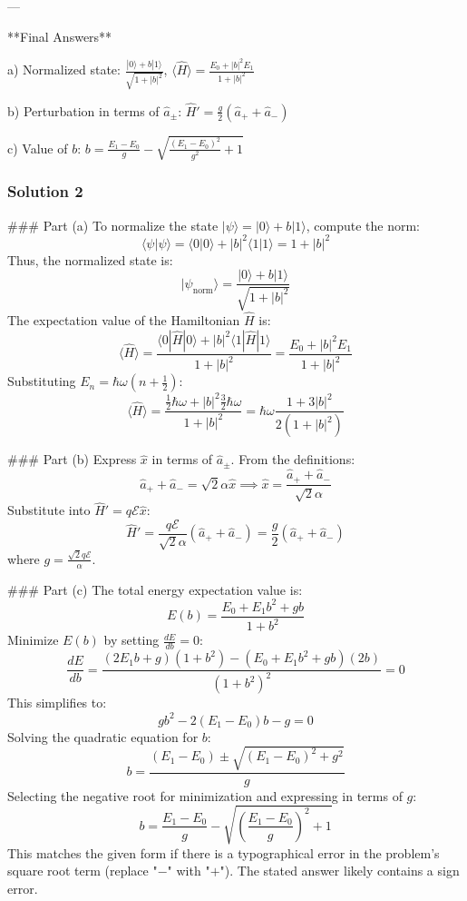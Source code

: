 \documentclass{article}
\begin{document}
---

**Final Answers**

a) Normalized state: \(\frac{|0\rangle + b|1\rangle}{\sqrt{1 + |b|^2}}\), \(\langle \hat{H} \rangle = \boxed{\frac{E_0 + |b|^2 E_1}{1 + |b|^2}}\)

b) Perturbation in terms of \(\hat{a}_\pm\): \(\boxed{\hat{H}' = \frac{g}{2} (\hat{a}_+ + \hat{a}_-)}\)

c) Value of \(b\): \(\boxed{b = \frac{E_1 - E_0}{g} - \sqrt{\frac{(E_1 - E_0)^2}{g^2} + 1}}\)

\subsubsection{Solution 2}
### Part (a)
To normalize the state \( |\psi\rangle = |0\rangle + b |1\rangle \), compute the norm:
\[
\langle \psi | \psi \rangle = \langle 0|0\rangle + |b|^2 \langle 1|1\rangle = 1 + |b|^2
\]
Thus, the normalized state is:
\[
|\psi_{\text{norm}}\rangle = \frac{|0\rangle + b |1\rangle}{\sqrt{1 + |b|^2}}
\]
The expectation value of the Hamiltonian \( \hat{H} \) is:
\[
\langle \hat{H} \rangle = \frac{\langle 0|\hat{H}|0\rangle + |b|^2 \langle 1|\hat{H}|1\rangle}{1 + |b|^2} = \frac{E_0 + |b|^2 E_1}{1 + |b|^2}
\]
Substituting \( E_n = \hbar\omega(n + \frac{1}{2}) \):
\[
\langle \hat{H} \rangle = \frac{\frac{1}{2}\hbar\omega + |b|^2 \frac{3}{2}\hbar\omega}{1 + |b|^2} = \hbar\omega \frac{1 + 3|b|^2}{2(1 + |b|^2)}
\]

### Part (b)
Express \( \hat{x} \) in terms of \( \hat{a}_\pm \). From the definitions:
\[
\hat{a}_+ + \hat{a}_- = \sqrt{2}\alpha \hat{x} \implies \hat{x} = \frac{\hat{a}_+ + \hat{a}_-}{\sqrt{2}\alpha}
\]
Substitute into \( \hat{H}' = q\mathcal{E}\hat{x} \):
\[
\hat{H}' = \frac{q\mathcal{E}}{\sqrt{2}\alpha} (\hat{a}_+ + \hat{a}_-) = \frac{g}{2} (\hat{a}_+ + \hat{a}_-)
\]
where \( g = \frac{\sqrt{2}q\mathcal{E}}{\alpha} \).

### Part (c)
The total energy expectation value is:
\[
E(b) = \frac{E_0 + E_1 b^2 + g b}{1 + b^2}
\]
Minimize \( E(b) \) by setting \( \frac{dE}{db} = 0 \):
\[
\frac{dE}{db} = \frac{(2E_1 b + g)(1 + b^2) - (E_0 + E_1 b^2 + g b)(2b)}{(1 + b^2)^2} = 0
\]
This simplifies to:
\[
g b^2 - 2(E_1 - E_0) b - g = 0
\]
Solving the quadratic equation for \( b \):
\[
b = \frac{(E_1 - E_0) \pm \sqrt{(E_1 - E_0)^2 + g^2}}{g}
\]
Selecting the negative root for minimization and expressing in terms of \( g \):
\[
b = \frac{E_1 - E_0}{g} - \sqrt{\left(\frac{E_1 - E_0}{g}\right)^2 + 1}
\]
This matches the given form if there is a typographical error in the problem's square root term (replace "\(-\)" with "\(+\)"). The stated answer likely contains a sign error.
\end{document}
